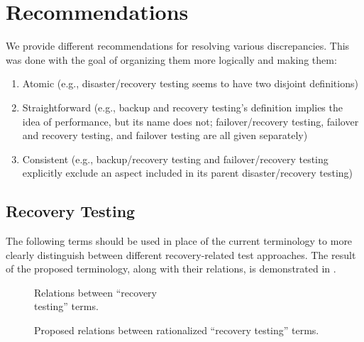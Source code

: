 \section{Recommendations}
\label{recs}

We provide different recommendations for resolving various
discrepancies. This was done with the goal of
organizing them more logically and making them:
\begin{enumerate}
      \item Atomic (e.g., disaster/recovery testing seems to have two
            disjoint definitions)
      \item Straightforward (e.g., backup and recovery testing's definition
            implies the idea of performance, but its name does not;
            failover/recovery testing, failover and recovery testing,
            and failover testing are all given separately)
      \item Consistent (e.g., backup/recovery testing and failover/recovery
            testing explicitly exclude an aspect included in its parent
            disaster/recovery testing)
\end{enumerate}

\subsection{Recovery Testing}
\label{rec-test-rec}
The following terms should be used in place of the current terminology to
more clearly distinguish between different recovery-related test approaches.
The result of the proposed terminology, along with their relations, is
demonstrated in .

\begin{figure}[bt!]
      \centering
      \begin{minipage}{.575\linewidth}
            \centering
            \recoveryGraphCurrent{}
            \caption{Relations between ``recovery\\
                  testing'' terms.}
            \label{fig:recovery-graph-current}
      \end{minipage}%
      \begin{minipage}{.425\linewidth}
            \centering
            \recoveryGraphProposed{}
            \caption{Proposed relations between
                  rationalized ``recovery testing'' terms.}
            \label{fig:recovery-graph-proposed}
      \end{minipage}
\end{figure}


